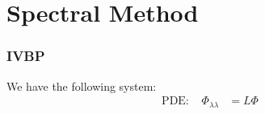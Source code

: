 

\section{Spectral Method}

	\begin{frame}
		\frametitle{IVBP}
		 
			We have the following system:
			\begin{align*}
			\text{PDE: }& \Phi_{\lambda \lambda}&=L\Phi\\
			\end{align*}
	\end{frame}
	
	